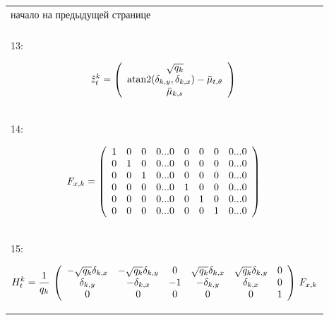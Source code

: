 \documentclass[10pt,a4paper]{article}
\begin{document}
\begin{table}[H]
\begin{center}
\begin{tabular}{|l|}
\hline
\hspace{70mm}$\boxed{\textit{начало на предыдущей странице}}$\\
{}\\
13:\hspace{9mm}
\begin{minipage}{0.2\textwidth}
				\begin{equation*}
				\hat{z}_t^k=\left(\begin{array}{c} \sqrt{q_k}\\
				\text{atan2}(\delta_{k,y},\delta_{k,x})-\bar{\mu}_{t,\theta}\\
				\bar{\mu}_{k,s}
				\end{array} \right)\\
				\end{equation*}
\end{minipage}\\
14:\hspace{9mm}
\begin{minipage}{0.2\textwidth}
				\begin{equation*}
				F_{x,k}=\left(\begin{array}{cccccccc} 
				1&0&0&0...0&0&0&0&0...0\\
				0&1&0&0...0&0&0&0&0...0\\
				0&0&1&0...0&0&0&0&0...0\\
				0&0&0&0...0&1&0&0&0...0\\
				0&0&0&0...0&0&1&0&0...0\\
				0&0&0&0...0&0&0&1&0...0
				\end{array} \right)\\
				\end{equation*}
\end{minipage}\\
15:\hspace{9mm}
\begin{minipage}{0.2\textwidth}
				\begin{equation*}
				H_t^k=\frac{1}{q_k}\,\left(\begin{array}{cccccc} -\sqrt{q_k}\delta_{k,x}&-\sqrt{q_k}\delta_{k,y}&0&\sqrt{q_k}\delta_{k,x}&\sqrt{q_k}\delta_{k,y}&0\\
				\delta_{k,y}&-\delta_{k,x}&-1&-\delta_{k,y}&\delta_{k,x}&0\\
				0&0&0&0&0&1
				\end{array} \right)\\\,F_{x,k}

\end{equation*}
\end{minipage}
\end{tabular}
\end{center}
\end{table}
\end{document}
